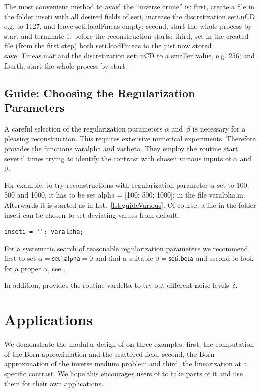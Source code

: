 \documentclass[a4paper]{article}
\begin{document}
The most convenient method to avoid the ``inverse crime'' is: first, create a file in the folder \textsf{inseti} with all desired fields of \textsf{seti}, increase the discretization \textsf{seti.nCD}, e.g. to 1127, and leave \textsf{seti.loadFmeas} empty; second, start the whole process by \textsf{start} and terminate it before the reconstruction starts; third, set in the created file (from the first step) both \textsf{seti.loadFmeas} to the just now stored \textsf{save\_Fmeas.mat} and the discretization \textsf{seti.nCD} to a smaller value, e.g. 256; and fourth, start the whole process by \textsf{start}.


\subsection{Guide: Choosing the Regularization Parameters}\label{sec:guide:various}

A careful selection of the regularization parameters $\alpha$ and~$\beta$ is necessary for a pleasing reconstruction. This requires extensive numerical experiments. Therefore \IPscatt provides the functions \textsf{varalpha} and \textsf{varbeta}. They employ the routine \textsf{start} several times trying to identify the contrast with chosen various inputs of $\alpha$ and~$\beta$.

For example, to try reconstructions with regularization parameter $\alpha$ set to 100, 500 and 1000, it has to be set \textsf{alpha = [100; 500; 1000];} in the file \textsf{varalpha.m}. Afterwards it is started as in Lst.~\ref{lst:guideVarious}. Of course, a file in the folder \textsf{inseti} can be chosen to set deviating values from default.

\begin{lstlisting}[caption={Various regularization parameters.},label=lst:guideVarious]
inseti = ''; varalpha;
\end{lstlisting}

For a systematic search of reasonable regularization parameters we recommend first to set $\alpha = \textsf{seti.alpha} = 0$ and find a suitable $\beta = \textsf{seti.beta}$ and second to look for a proper $\alpha$, see \cite[Sec.~5]{Buergel2017}. 

In addition, \IPscatt provides the routine \textsf{vardelta} to try out different noise levels~$\delta$.


\section{Applications}\label{sec:applications}
We demonstrate the modular design of \IPscatt on three examples: first, the computation of the Born approximation and the scattered field, second, the Born approximation of the inverse medium problem and third, the linearization at a specific contrast. We hope this encourages users of \IPscatt to take parts of it and use them for their own applications.
\end{document}
